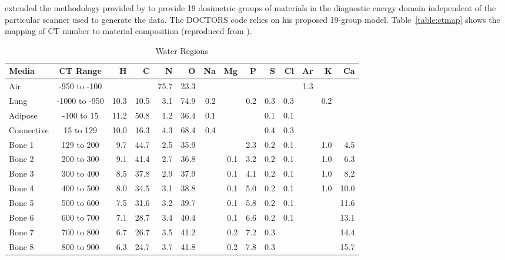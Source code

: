\citet{ref:ottossonr} extended the methodology provided by \citet{ref:schneideru} to provide 19 dosimetric groups of materials in the diagnostic energy domain independent of the particular scanner used to generate the data. The DOCTORS code relies on his proposed 19-group model. Table~\ref{table:ctmap} shows the mapping of CT number to material composition (reproduced from \citep{ref:ottossonr}).

\begin{sidewaystable}[ht]
\caption{Water Regions}
\centering 
\begin{tabular}{l c r r r r r r r r r r r r}
\hline \hline   
Media       & CT Range      & H    & C    & N    & O    & Na  & Mg  & P    & S   & Cl  & Ar  & K   & Ca \\ [0.5ex] 
\hline
Air         & -950 to -100  &      &      & 75.7 & 23.3 &     &     &      &     &     & 1.3 &     &      \\
Lung        & -1000 to -950 & 10.3 & 10.5 &  3.1 & 74.9 & 0.2 &     &  0.2 & 0.3 & 0.3 &     & 0.2 &      \\
Adipose     & -100 to 15    & 11.2 & 50.8 &  1.2 & 36.4 & 0.1 &     &      & 0.1 & 0.1 &     &     &      \\
Connective  & 15 to 129     & 10.0 & 16.3 &  4.3 & 68.4 & 0.4 &     &      & 0.4 & 0.3 &     &     &      \\
Bone 1      & 129 to 200    &  9.7 & 44.7 &  2.5 & 35.9 &     &     &  2.3 & 0.2 & 0.1 &     & 1.0 &  4.5 \\ 
Bone 2      & 200 to 300    &  9.1 & 41.4 &  2.7 & 36.8 &     & 0.1 &  3.2 & 0.2 & 0.1 &     & 1.0 &  6.3 \\ 
Bone 3      & 300 to 400    &  8.5 & 37.8 &  2.9 & 37.9 &     & 0.1 &  4.1 & 0.2 & 0.1 &     & 1.0 &  8.2 \\ 
Bone 4      & 400 to 500    &  8.0 & 34.5 &  3.1 & 38.8 &     & 0.1 &  5.0 & 0.2 & 0.1 &     & 1.0 & 10.0 \\ 
Bone 5      & 500 to 600    &  7.5 & 31.6 &  3.2 & 39.7 &     & 0.1 &  5.8 & 0.2 & 0.1 &     &     & 11.6 \\ 
Bone 6      & 600 to 700    &  7.1 & 28.7 &  3.4 & 40.4 &     & 0.1 &  6.6 & 0.2 & 0.1 &     &     & 13.1 \\ 
Bone 7      & 700 to 800    &  6.7 & 26.7 &  3.5 & 41.2 &     & 0.2 &  7.2 & 0.3 &     &     &     & 14.4 \\ 
Bone 8      & 800 to 900    &  6.3 & 24.7 &  3.7 & 41.8 &     & 0.2 &  7.8 & 0.3 &     &     &     & 15.7 \\ 

\end{tabular}
\end{sidewaystable}
